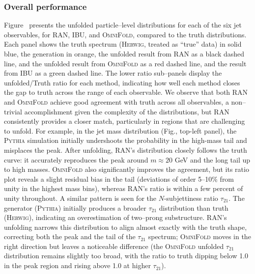         \subsubsection{Overall performance}
            Figure~ presents the unfolded particle--level distributions for each of the six jet observables, for RAN, IBU, and \textsc{OmniFold}, compared to the truth distributions.
            Each panel shows the truth spectrum (\textsc{Herwig}, treated as “true” data) in solid blue, the generation in orange, the unfolded result from RAN as a black dashed line, and the unfolded result from \textsc{OmniFold} as a red dashed line, and the result from IBU as a green dashed line.
            The lower ratio sub--panels display the unfolded/Truth ratio for each method, indicating how well each method closes the gap to truth across the range of each observable.
            We observe that both RAN and \textsc{OmniFold} achieve good agreement with truth across all observables, a non--trivial accomplishment given the complexity of the distributions, but RAN consistently provides a closer match, particularly in regions that are challenging to unfold.
            For example, in the jet mass distribution (Fig., top-left panel), the \textsc{Pythia} simulation initially undershoots the probability in the high-mass tail and misplaces the peak.
            After unfolding, RAN’s distribution closely follows the truth curve: it accurately reproduces the peak around $m\approx 20$ GeV and the long tail up to high masses. \textsc{OmniFold} also significantly improves the agreement, but its ratio plot reveals a slight residual bias in the tail (deviations of order 5–10\% from unity in the highest mass bins), whereas RAN’s ratio is within a few percent of unity throughout.
            A similar pattern is seen for the $N$-subjettiness ratio $\tau_{21}$.
            The generator (\textsc{Pythia}) initially produces a broader $\tau_{21}$ distribution than truth (\textsc{Herwig}), indicating an overestimation of two--prong substructure.
            RAN’s unfolding narrows this distribution to align almost exactly with the truth shape, correcting both the peak and the tail of the $\tau_{21}$ spectrum; \textsc{OmniFold} moves in the right direction but leaves a noticeable difference (the \textsc{OmniFold} unfolded $\tau_{21}$ distribution remains slightly too broad, with the ratio to truth dipping below 1.0 in the peak region and rising above 1.0 at higher $\tau_{21}$).
